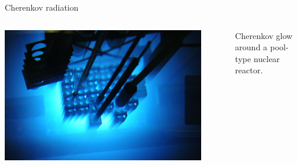 \begin{frame}{Cherenkov radiation}

\begin{columns}
  \begin{column}{0.60\textwidth}
    \begin{center}
      \includegraphics[width=0.90\textwidth]{./images/photos/cherenkov_light.jpg}\\
    \end{center}
  \end{column}
  \begin{column}{0.40\textwidth}
      Cherenkov glow around a pool-type nuclear reactor.
  \end{column}
\end{columns}

\end{frame}


%
%
%

%
%
%

